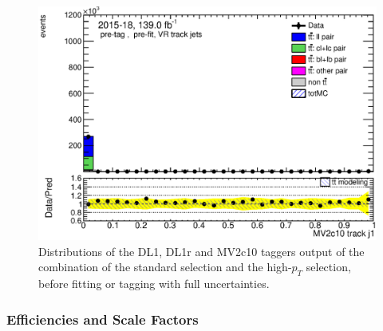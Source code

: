 \documentclass[letterpaper,12pt]{article}
\begin{document}
\begin{figure}[h]
\begin{minipage}[b]{.45\textwidth}
	\includegraphics[width=1\textwidth]{Oct_distributions/pretagNoRwDL1rwithhighpTVRJets_scaledall/DataMC_J1_MV2c10.eps}
	\end{minipage}
	\caption{Distributions of the DL1, DL1r and MV2c10 taggers output of 
	the combination of the standard selection and the high-$p_T$ selection, 
	before fitting or tagging with full uncertainties.} \label{fig:taggers_VRJets}
	\end{figure}	

\subsubsection{Efficiencies and Scale Factors}
\end{document}
